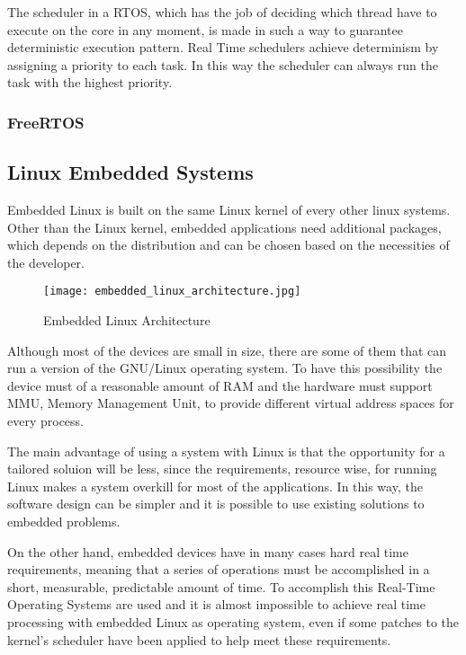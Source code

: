 The scheduler in a RTOS, which has the job of deciding which thread have to
execute on the core in any moment, is made in such a way to guarantee 
deterministic execution pattern. Real Time schedulers achieve determinism by
assigning a priority to each task. In this way the scheduler can always run the
task with the highest priority. \cite{freeRTOS}

\subsubsection{FreeRTOS}

\subsection{Linux Embedded Systems}

Embedded Linux is built on the same Linux kernel of every other linux systems.
Other than the Linux kernel, embedded applications need additional packages,
which depends on the distribution and can be chosen based on the necessities
of the developer. ~\cite{embedded_linux_windriver}

\begin{figure}
    \centering
    \texttt{[image: embedded\_linux\_architecture.jpg]}
    \caption{Embedded Linux Architecture}
    \label{fig:embedded_linux_architecture}
\end{figure}

Although most of the devices are small in size, there are some of them that can
run a version of the GNU/Linux operating system. To have this possibility the
device must of a reasonable amount of RAM and the hardware must support MMU,
Memory Management Unit, to provide different virtual address spaces for every
process.

The main advantage of using a system with Linux is that the opportunity for a
tailored soluion will be less, since the requirements, resource wise, for
running Linux makes a system overkill for most of the applications.
In this way, the software design can be simpler and it is possible to use
existing solutions to embedded problems.

On the other hand, embedded devices have in many cases hard real time
requirements, meaning that a series of operations must be accomplished in a
short, measurable, predictable amount of time. To accomplish this Real-Time
Operating Systems are used and it is almost impossible to achieve real time
processing with embedded Linux as operating system, even if some patches 
to the kernel's scheduler have been applied to help meet these requirements.

